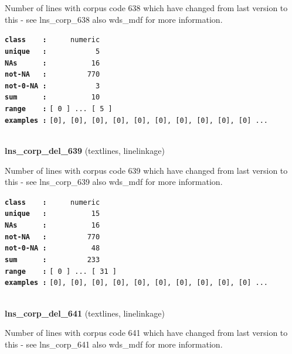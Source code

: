 \documentclass[]{article}
\begin{document}
Number of lines with corpus code 638 which have changed from last
version to this - see lns\_corp\_638 also wds\_mdf for more information.

\textbf{\texttt{class\ \ \ \ :}} \texttt{~~~~~numeric}\\
\textbf{\texttt{unique\ \ \ :}} \texttt{~~~~~~~~~~~5}\\
\textbf{\texttt{NAs\ \ \ \ \ \ :}} \texttt{~~~~~~~~~~16}\\
\textbf{\texttt{not-NA\ \ \ :}} \texttt{~~~~~~~~~770}\\
\textbf{\texttt{not-0-NA\ :}} \texttt{~~~~~~~~~~~3}\\
\textbf{\texttt{sum\ \ \ \ \ \ :}} \texttt{~~~~~~~~~~10}\\
\textbf{\texttt{range\ \ \ \ :}}
\texttt{{[}\ 0\ {]}\ ...\ {[}\ 5\ {]}}\\
\textbf{\texttt{examples\ :}}
\texttt{{[}0{]},\ {[}0{]},\ {[}0{]},\ {[}0{]},\ {[}0{]},\ {[}0{]},\ {[}0{]},\ {[}0{]},\ {[}0{]},\ {[}0{]}\ ...}\\

~

\textbf{lns\_corp\_del\_639} (textlines, linelinkage)

Number of lines with corpus code 639 which have changed from last
version to this - see lns\_corp\_639 also wds\_mdf for more information.

\textbf{\texttt{class\ \ \ \ :}} \texttt{~~~~~numeric}\\
\textbf{\texttt{unique\ \ \ :}} \texttt{~~~~~~~~~~15}\\
\textbf{\texttt{NAs\ \ \ \ \ \ :}} \texttt{~~~~~~~~~~16}\\
\textbf{\texttt{not-NA\ \ \ :}} \texttt{~~~~~~~~~770}\\
\textbf{\texttt{not-0-NA\ :}} \texttt{~~~~~~~~~~48}\\
\textbf{\texttt{sum\ \ \ \ \ \ :}} \texttt{~~~~~~~~~233}\\
\textbf{\texttt{range\ \ \ \ :}}
\texttt{{[}\ 0\ {]}\ ...\ {[}\ 31\ {]}}\\
\textbf{\texttt{examples\ :}}
\texttt{{[}0{]},\ {[}0{]},\ {[}0{]},\ {[}0{]},\ {[}0{]},\ {[}0{]},\ {[}0{]},\ {[}0{]},\ {[}0{]},\ {[}0{]}\ ...}\\

~

\textbf{lns\_corp\_del\_641} (textlines, linelinkage)

Number of lines with corpus code 641 which have changed from last
version to this - see lns\_corp\_641 also wds\_mdf for more information.
\end{document}
